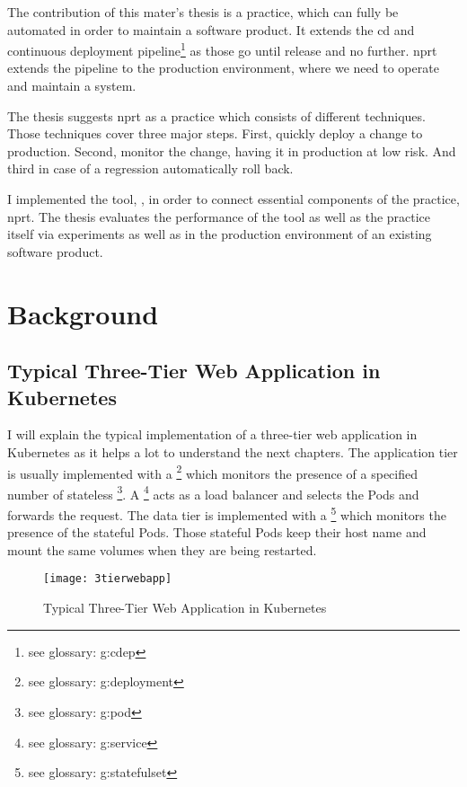 The contribution of this mater's thesis is a practice, which can fully be automated in
order to maintain a software product. It extends the \gls{cd} and continuous deployment
pipeline\footnote{see glossary: \gls{g:cdep}} as those go until release and no
further. \gls{nprt} extends the pipeline to the production environment, where we need to
operate and maintain a system.

The thesis suggests \gls{nprt} as a practice which consists of different techniques. Those
techniques cover three major steps. First, quickly deploy a change to production. Second,
monitor the change, having it in production at low risk. And third in case of a regression
automatically roll back.

I implemented the tool, \deployer{}, in order to connect essential components of the
practice, \gls{nprt}. The thesis evaluates the performance of the tool as well as the
practice itself via experiments as well as in the production environment of an existing
software product.

\chapter{Background}
\label{chap:background}

\section{Typical Three-Tier Web Application in Kubernetes}

I will explain the typical implementation of a three-tier web application in Kubernetes as it helps a
lot to understand the next chapters. The application tier is usually implemented with a
\footnote{see glossary: \gls{g:deployment}} which
monitors the presence of a specified number of stateless \footnote{see
  glossary: \gls{g:pod}}. A \footnote{see glossary: \gls{g:service}} acts as
a load balancer and selects the Pods and forwards the request. The data tier is
implemented with a \footnote{see glossary: \gls{g:statefulset}} which
monitors the presence of the stateful Pods. Those stateful Pods keep their host name and
mount the same volumes when they are being restarted.

\begin{figure}[htbp]
  \centering
  \texttt{[image: 3tierwebapp]}
  \caption{Typical Three-Tier Web Application in Kubernetes}
  \label{fig:3tierwebapp}
\end{figure}

